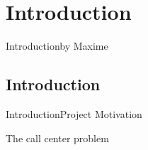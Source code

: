 \section{Introduction}
\begin{frame}{Introduction}{by Maxime}
\small
{}	
\end{frame}

\subsection{Introduction}
\begin{frame}{Introduction}{Project Motivation}
	\begin{center}
	The call center problem 
	\end{center}
\end{frame}



